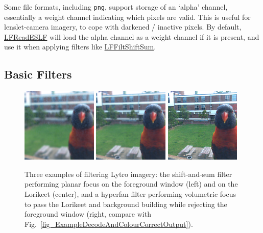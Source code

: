 \documentclass[onecolumn]{article}
\newcommand{\CiteFunction}[1]{\hyperlink{#1}{\small #1}}
\newcommand{\SymbolText}[1]{\texttt{\small #1}}
\begin{document}
Some file formats, including \SymbolText{png}, support storage of an `alpha' channel, essentially a weight channel indicating which pixels are valid. This is useful for lenslet-camera imagery, to cope with darkened / inactive pixels. By default, \CiteFunction{LFReadESLF} will load the alpha channel as a weight channel if it is present, and use it when applying filters like \CiteFunction{LFFiltShiftSum}.

\subsection{Basic Filters}

\begin{figure}
	\centering
	\includegraphics[width=0.32\textwidth]{Figs/Sample2_ShiftSumWindow}
	\includegraphics[width=0.32\textwidth]{Figs/Sample2_ShiftSumLorikeet}
	\includegraphics[width=0.32\textwidth]{Figs/Sample2_HyperfanNoWindow}
	\caption{Three examples of filtering Lytro imagery: the shift-and-sum filter performing planar focus on the foreground window (left) and on the Lorikeet (center), and a hyperfan filter performing volumetric focus to pass the Lorikeet and background building while rejecting the foreground window (right, compare with Fig.~\ref{fig_ExampleDecodeAndColourCorrectOutput}).}
	\label{fig_ExampleFilterOutputLytro}
\end{figure}
\end{document}
